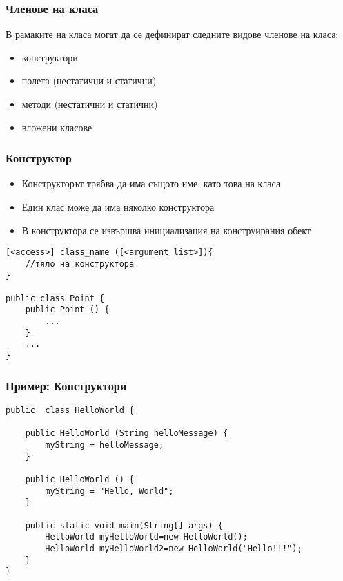 \documentclass[ignorenonframetext, hyperref=unicode,compress]{beamer}
\begin{document}
\begin{frame}[containsverbatim]\frametitle{Членове на класа}
В рамаките на класа могат да се дефинират следните видове членове на класа:
\begin{itemize}
 \item конструктори
 \item полета (нестатични и статични)
 \item методи (нестатични и статични)
 \item вложени класове
\end{itemize}
\end{frame}

\begin{frame}[containsverbatim]\frametitle{Конструктор}
\begin{itemize}
 \item Конструкторът трябва да има същото име, като това на класа
 \item Един клас може да има няколко конструктора
 \item В конструктора се извършва инициализация на конструирания обект
\end{itemize}
\begin{lstlisting}
[<access>] class_name ([<argument list>]){
	//тяло на конструктора
}

public class Point {
	public Point () {
		...
	}
	...
}
\end{lstlisting}
\end{frame}


\begin{frame}[containsverbatim]\frametitle{Пример: Конструктори}
\begin{lstlisting}
public  class HelloWorld {
	
 	public HelloWorld (String helloMessage) {
 		myString = helloMessage;
	}
	
 	public HelloWorld () {
 		myString = "Hello, World";
	}
	
	public static void main(String[] args) {
 		HelloWorld myHelloWorld=new HelloWorld();
		HelloWorld myHelloWorld2=new HelloWorld("Hello!!!");
	}
}
\end{lstlisting}
\end{frame}
\end{document}

